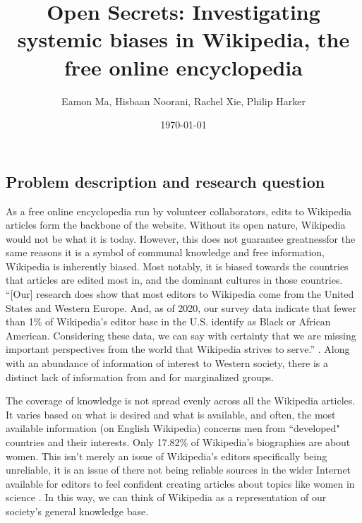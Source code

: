 \documentclass[fontsize=12pt]{article}
\title{Open Secrets: Investigating systemic biases in Wikipedia, the free online encyclopedia}
\author{Eamon Ma, Hisbaan Noorani, Rachel Xie, Philip Harker}
\date{\today}
\begin{document}
\maketitle
\begin{multicols}{2}
    \noindent
    
    
    
    \section{Problem description and research question}  %
    
    As a free online encyclopedia run by volunteer collaborators, edits to Wikipedia articles form the backbone of the website. Without its open nature, Wikipedia would not be what it is today. However, this does not guarantee greatness\textemdash for the same reasons it is a symbol of communal knowledge and free information, Wikipedia is inherently biased. Most notably, it is biased towards the countries that articles are edited most in, and the dominant cultures in those countries. ``[Our] research does show that most editors to Wikipedia come from the United States and Western Europe. And, as of 2020, our survey data indicate that fewer than 1\% of Wikipedia’s editor base in the U.S. identify as Black or African American. Considering these data, we can say with certainty that we are missing important perspectives from the world that Wikipedia strives to serve.'' \parencite{Uzzell}. Along with an abundance of information of interest to Western society, there is a distinct lack of information from and for marginalized groups. 
    
    The coverage of knowledge is not spread evenly across all the Wikipedia articles. It varies based on what is desired and what is available, and often, the most available information (on English Wikipedia) concerns men from ``developed" countries and their interests. Only 17.82\% of Wikipedia's biographies are about women. This isn't merely an issue of Wikipedia's editors specifically being unreliable, it is an issue of there not being reliable sources in the wider Internet available for editors to feel confident creating articles about topics like women in science \parencite{Erhart}. In this way, we can think of Wikipedia as a representation of our society's general knowledge base. 
    

\end{multicols}
\end{document}
